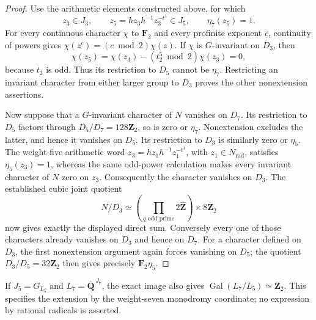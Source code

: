 \begin{proof}
Use the arithmetic elements constructed above, for which
\[
 z_3\in J_3,\qquad
 z_5=h z_3h^{-1}z_3^{-t^5}\in J_5,
 \qquad \eta_7(z_5)=1.
\]
For every continuous character $\chi$ to $\mathbf F_2$ and every
profinite exponent $c$, continuity of powers gives
$\chi(z^c)=(c\bmod2)\chi(z)$. If $\chi$ is $G$-invariant on
$D_3$, then
\[
 \chi(z_5)=\chi(z_3)-(t_2^5\bmod2)\chi(z_3)=0,
\]
because $t_2$ is odd. Thus its restriction to $D_5$ cannot be
$\eta_7$. Restricting an invariant character from either larger
group to $D_3$ proves the other nonextension assertions.

Now suppose that a $G$-invariant character of $N$ vanishes on
$D_7$. Its restriction to $D_5$ factors through
$D_5/D_7=128\mathbf Z_2$, so is zero or $\eta_7$.
Nonextension excludes the latter, and hence it vanishes on $D_5$.
Its restriction to $D_3$ is similarly zero or $\eta_5$.
The weight-five arithmetic word
$z_3=h z_1h^{-1}z_1^{-t^3}$, with $z_1\in N_{\mathrm{rad}}$,
satisfies $\eta_5(z_3)=1$, whereas the same odd-power calculation
makes every invariant character of $N$ zero on $z_3$.
Consequently the character vanishes on $D_3$.
The established cubic joint quotient
\[
 N/D_3\simeq
 \left(\prod_{q\text{ odd prime}}2\widehat{\mathbf Z}\right)
       \times8\mathbf Z_2
\]
now gives exactly the displayed direct sum. Conversely every one
of those characters already vanishes on $D_3$ and hence on $D_7$.
For a character defined on $D_3$, the first nonextension argument
again forces vanishing on $D_5$; the quotient
$D_3/D_5=32\mathbf Z_2$ then gives precisely $\mathbf F_2\eta_5$.
\end{proof}

If $J_5=G_{L_5}$ and $L_7=\overline{\mathbf Q}^{\,J_7}$, the exact
image also gives $\operatorname{Gal}(L_7/L_5)\simeq\mathbf Z_2$.
This specifies the extension by the weight-seven monodromy
coordinate; no expression by rational radicals is asserted.
